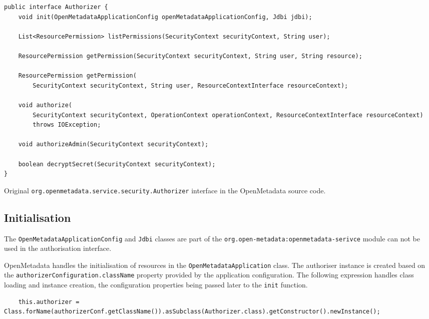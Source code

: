 \begin{listing}

\begin{verbatim}
public interface Authorizer {
    void init(OpenMetadataApplicationConfig openMetadataApplicationConfig, Jdbi jdbi);

    List<ResourcePermission> listPermissions(SecurityContext securityContext, String user);

    ResourcePermission getPermission(SecurityContext securityContext, String user, String resource);

    ResourcePermission getPermission(
        SecurityContext securityContext, String user, ResourceContextInterface resourceContext);

    void authorize(
        SecurityContext securityContext, OperationContext operationContext, ResourceContextInterface resourceContext)
        throws IOException;

    void authorizeAdmin(SecurityContext securityContext);

    boolean decryptSecret(SecurityContext securityContext);
}
\end{verbatim}

\caption{Original \texttt{org.openmetadata.service.security.Authorizer} interface in the OpenMetadata source code.}
\label{listing:original_authorizer}

\end{listing}

\subsection{Initialisation}

The \texttt{OpenMetadataApplicationConfig} and \texttt{Jdbi} classes are part of the \texttt{org.open-metadata:openmetadata-serivce} module can not be used in the authorisation interface.

OpenMetadata handles the initialisation of resources in the \texttt{OpenMetadataApplication} class. The authoriser instance is created based on the \texttt{authorizerConfiguration.className} property provided by the application configuration. The following expression handles class loading and instance creation, the configuration properties being passed later to the \texttt{init} function.

\begin{verbatim}
    this.authorizer = Class.forName(authorizerConf.getClassName()).asSubclass(Authorizer.class).getConstructor().newInstance();
\end{verbatim}

